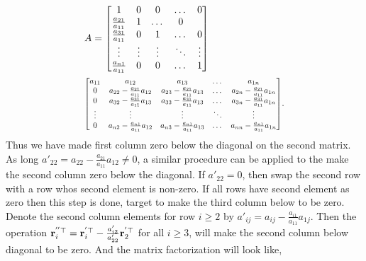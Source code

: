 \documentclass{article}
\begin{document}
\begin{align*}
  &A=\begin{bmatrix} 1  & 0  &  0 &  \dots  & 0 \\
    \frac{a_{21}}{a_{11}} & 1  & \dots  &   0  \\
    \frac{a_{31}}{a_{11}} & 0  & 1 & \dots  &   0  \\
    \vdots  & \vdots &  \vdots  &   \ddots  &  \vdots   \\
    \frac{a_{n1}}{a_{11}} & 0 &  0   &  \dots  & 1
  \end{bmatrix}  \\
  &  \scalebox{0.8}{\mbox{$\begin{bmatrix}
        a_{11} & a_{12}  &  a_{13} &     \dots &  a_{1n} \\
        0 & a_{22}-\frac{a_{21}}{a_{11}}a_{12}  & a_{23}-\frac{a_{21}}{a_{11}}a_{13} &  \dots &  a_{2n} -\frac{a_{21}}{a_{11}}a_{1n}\\
        0 & a_{32} -\frac{a_{31}}{a_{11}}a_{13} &  a_{33}-\frac{a_{31}}{a_{11}}a_{13} &     \dots &  a_{3n}-\frac{a_{31}}{a_{11}}a_{1n} \\
        \vdots &  \vdots  & \vdots &  \ddots & \vdots \\
        0 & a_{n2}-\frac{a_{n1}}{a_{11}}a_{12}  &  a_{n3} -\frac{a_{n1}}{a_{11}}a_{13}&   \dots &  a_{nn}-\frac{a_{n1}}{a_{11}}a_{1n}
      \end{bmatrix}$}}.
\end{align*}
% 
Thus we  have made first  column   zero below  the  diagonal  on  the  second
matrix. As long $a'_{22} = a_{22} - \frac{a_{21}}{a_{11}}a_{12} \ne 0$,  a  similar procedure  can be  applied to the make the second
column  zero  below   the  diagonal. If $a'_{22} = 0$, then swap the second row
with a row whos second  element is non-zero. If all  rows  have   second element
as zero then this step  is done,  target  to   make  the third column  below to
be zero.  Denote the  second  column  elements  for
row  $i \ge 2$ by
$a'_{ij} = a_{ij}  - \frac{a_{i1}}{a_{11}}a_{1j}$.  Then   the  operation
$\mathbf{r}_{i}^{''\top} = \mathbf{r}_i^{'\top}  - \frac{a'_{i2}}{a'_{22}}\mathbf{r}_2^{'\top}$  for all
$i \ge 3$, will
make the second  column below diagonal  to be  zero. And the matrix
factorization will look  like,
% 
\end{document}
